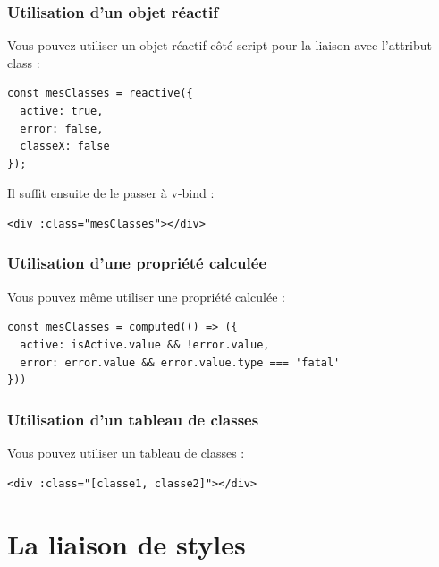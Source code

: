\documentclass{article}
\begin{document}
\subsubsection{Utilisation d'un objet réactif}
Vous pouvez utiliser un objet réactif côté {\color{monOrange}script} pour la liaison avec l'attribut {\color{monOrange}class} :
\begin{verbatim}
const mesClasses = reactive({
  active: true,
  error: false,
  classeX: false
});
\end{verbatim}
Il suffit ensuite de le passer à {\color{monOrange}v-bind} :
\begin{verbatim}
<div :class="mesClasses"></div>
\end{verbatim}

\subsubsection{Utilisation d'une propriété calculée}
Vous pouvez même utiliser une propriété calculée :
\begin{verbatim}
const mesClasses = computed(() => ({
  active: isActive.value && !error.value,
  error: error.value && error.value.type === 'fatal'
}))
\end{verbatim}


\subsubsection{Utilisation d'un tableau de classes}
Vous pouvez utiliser un tableau de classes :
\begin{verbatim}
<div :class="[classe1, classe2]"></div>
\end{verbatim}


\section{La liaison de styles}
\end{document}

